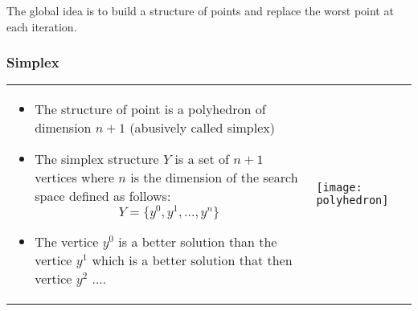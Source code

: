 The global idea is to build a structure of points and replace the worst
point at each iteration.

\subsubsection{Simplex}
\begin{tabular}{m{12cm}m{3cm}}
    \begin{itemize}
        \item The structure of point is a polyhedron of dimension $n+1$
            (abusively called simplex)

    \item The simplex structure $Y$ is a set of $n+1$ vertices where $n$ is the
dimension of the search space defined as follows:
$$Y = \{y^0,y^1,...,y^n\}$$

\item The vertice $y^0$ is a better solution than the vertice $y^1$ which is a better solution that then vertice $y^2$ ....
        \end{itemize}
&
\texttt{[image: polyhedron]}
\end{tabular}

